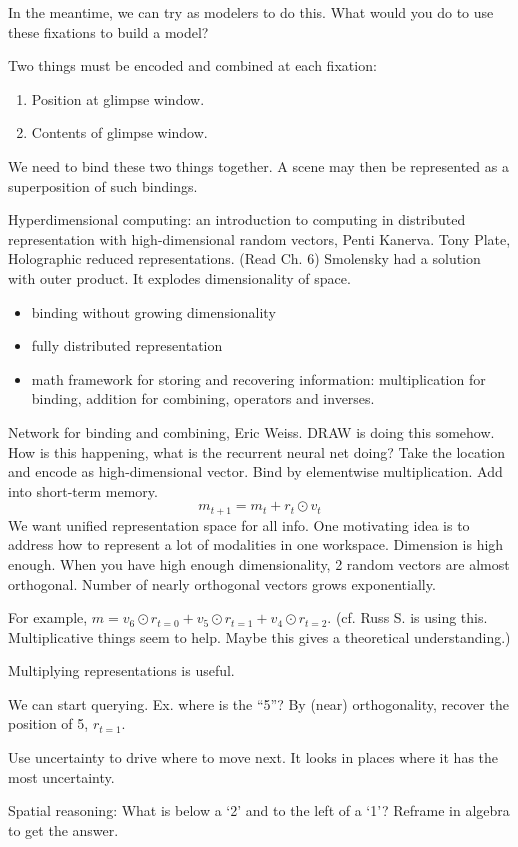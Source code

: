 \begin{enumerate}
In the meantime, we can try as modelers to do this. What would you do to use these fixations to build a model?

Two things must be encoded and combined at each fixation:
\begin{enumerate}
\item
Position at glimpse window.
\item
Contents of glimpse window. 
\end{enumerate}
We need to bind these two things together. A scene may then be represented as a superposition of such bindings.

Hyperdimensional computing: an introduction to computing in distributed representation with high-dimensional random vectors, Penti Kanerva.
Tony Plate, Holographic reduced representations. (Read Ch. 6)
Smolensky had a solution with outer product. It explodes dimensionality of space.
\begin{itemize}
\item
binding without growing dimensionality
\item
fully distributed representation
\item
math framework for storing and recovering information: multiplication for binding, addition for combining, operators and inverses.
\end{itemize}

Network for binding and combining, Eric Weiss. DRAW is doing this somehow. How is this happening, what is the recurrent neural net doing? Take the location and encode as high-dimensional vector. 
Bind by elementwise multiplication. Add into short-term memory.
$$
m_{t+1} = m_t + r_t\odot v_t
$$
We want unified representation space for all info. One motivating idea is to address how to represent a lot of modalities in one workspace. Dimension is high enough.
When you have high enough dimensionality, 2 random vectors are almost orthogonal. Number of nearly orthogonal vectors grows exponentially.

For example, $m=v_6\odot r_{t=0}+v_5\odot r_{t=1} + v_4 \odot r_{t=2}$.
(cf. Russ S. is using this. Multiplicative things seem to help. Maybe this gives a theoretical understanding.)

Multiplying representations is useful.


We can start querying.
Ex. where is the ``5''? By (near) orthogonality, recover the position of 5, $r_{t=1}$. 

Use uncertainty to drive where to move next. It looks in places where it has the most uncertainty.

Spatial reasoning: What is below a `2' and to the left of a `1'? Reframe in algebra to get the answer. 
\end{enumerate}


